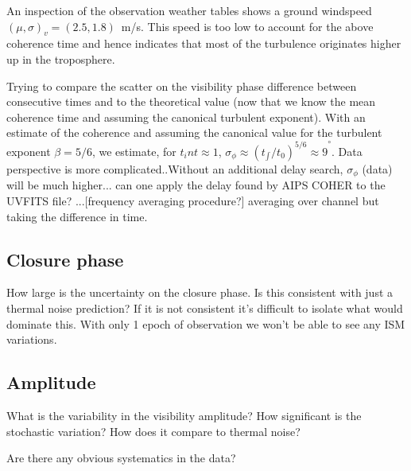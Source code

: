 \documentclass{article}
\begin{document}
An inspection of the observation weather tables shows a ground windspeed  $(\mu, \sigma)_v = (2.5, 1.8)$~m/s. This speed is too low to account for the above coherence time and hence indicates that most of the turbulence originates higher up in the troposphere.


Trying to compare the scatter on the visibility phase difference between consecutive times and to the theoretical value (now that we know the mean coherence time and assuming the canonical turbulent exponent). With an estimate of the coherence and assuming the canonical value for the turbulent exponent $\beta = 5/6$, we estimate, for $t_int \approx 1$, ${\sigma_\phi \approx (t_{\int}/t_0)^{5/6} \approx 9}^\circ$. Data perspective is more complicated..Without an additional delay search, $\sigma_\phi$ (data) will be much higher... can one apply the delay found by AIPS COHER to the UVFITS file? ...[frequency averaging procedure?] averaging over channel but taking the difference in time. 

\subsection{Closure phase} 

How large is the uncertainty on the closure phase. Is this consistent with just a thermal noise prediction? If it is not consistent it's difficult to isolate what would dominate this. With only 1 epoch of observation we won't be able to see any ISM variations.


\subsection{Amplitude}

What is the variability in the visibility amplitude? How significant is the stochastic variation? How does it compare to thermal noise?

Are there any obvious systematics in the data? 
\end{document}
